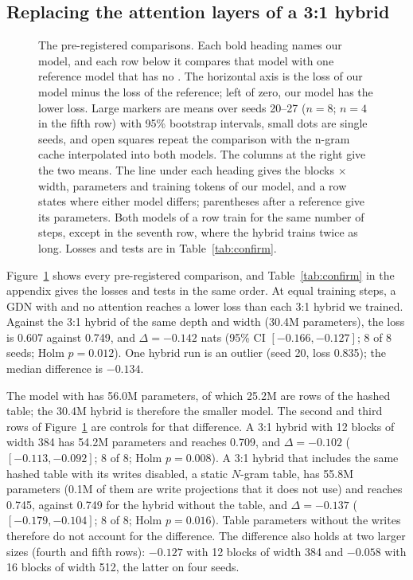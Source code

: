 \subsection{Replacing the attention layers of a 3:1 hybrid}
\label{sec:replace}

\begin{figure}[tb]
\centering
\resizebox{\textwidth}{!}{}
\caption{The pre-registered comparisons. Each bold heading names our model, and each row below it
compares that model with one reference model that has no \ingram{}. The horizontal axis is the
loss of our model minus the loss of the reference; left of zero, our model has the lower loss.
Large markers are means over
seeds 20--27 ($n = 8$; $n = 4$ in the fifth row) with 95\% bootstrap intervals, small dots are
single seeds, and open squares repeat the comparison with the n-gram cache interpolated into both
models. The columns at the right give the two means. The line under each heading gives the
blocks $\times$ width, parameters and training tokens of our model, and a row states where either
model differs; parentheses after a reference give its parameters. Both models of a row train for
the same number of steps, except in the seventh row, where the hybrid trains twice as long. Losses
and tests are in Table~\ref{tab:confirm}.}
\label{fig:confirm}
\end{figure}

Figure~\ref{fig:confirm} shows every pre-registered comparison, and Table~\ref{tab:confirm} in the
appendix gives the losses and tests in the same order. At equal training steps, a GDN with
\ingram{} and no attention reaches a lower loss than each 3:1 hybrid we trained. Against the 3:1
hybrid of the same depth and width (30.4M parameters), the loss is 0.607 against 0.749, and
$\Delta = -0.142$ nats (95\% CI $[-0.166, -0.127]$; 8 of 8 seeds; Holm $p = 0.012$). One hybrid
run is an outlier (seed 20, loss 0.835); the median difference is $-0.134$.

The model with \ingram{} has 56.0M parameters, of which 25.2M are rows of the hashed table; the
30.4M hybrid is therefore the smaller model. The second and third rows of
Figure~\ref{fig:confirm} are controls for that difference. A 3:1 hybrid with 12 blocks of width
384 has 54.2M parameters and reaches 0.709, and $\Delta = -0.102$ ($[-0.113, -0.092]$; 8 of 8;
Holm $p = 0.008$). A 3:1 hybrid that includes the same hashed table with its writes disabled, a
static $N$-gram table, has 55.8M parameters (0.1M of them are write projections that it does not
use) and reaches 0.745, against 0.749 for the hybrid
without the table, and $\Delta = -0.137$ ($[-0.179, -0.104]$; 8 of 8; Holm $p = 0.016$). Table
parameters without the writes therefore do not account for the difference. The difference also
holds at two larger sizes (fourth and fifth rows): $-0.127$ with 12 blocks of width 384 and
$-0.058$ with 16 blocks of width 512, the latter on four seeds.

